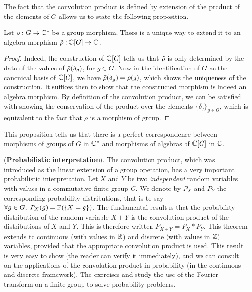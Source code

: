 The fact that the convolution product is defined by extension of the product of the elements of $G$ allows us to state the following proposition.

\begin{prop}
\label{prop-extension-morphism-grpe-algebra}
Let $\rho: G \rightarrow \mathbb{C}^*$ be a group morphism. There is a unique way to extend it to an algebra morphism $\tilde{\rho}: \mathbb{C}[G] \rightarrow \mathbb{C}$.
\end{prop}
\begin{proof}
Indeed, the construction of $\mathbb{C}[G]$ tells us that $\tilde{\rho}$ is only determined by the data of the values of $\tilde{\rho}(\delta_g)$, for $ g \in G$. Now in the identification of $G$ as the canonical basis of $\mathbb{C}[G]$, we have $\tilde{\rho}(\delta_g) = \rho(g)$, which shows the uniqueness of the construction. It suffices then to show that the constructed morphism is indeed an algebra morphism. By definition of the convolution product, we can be satisfied with showing the conservation of the product over the elements $\{\delta_g\}_{g \in G}$, which is equivalent to the fact that $\rho$ is a morphism of group.
\end{proof}
This proposition tells us that there is a perfect correspondence between morphisms of groups of $G$ in $\mathbb{C}^*$ and morphisms of algebras of $\mathbb{C}[G]$ in $\mathbb{C}$.

\begin{rem}{(\upshape \textbf{Probabilistic interpretation}).}
\label{rmk-interpretation-proba}
 The convolution product, which was introduced as the linear extension of a group operation, has a very important probabilistic interpretation. Let $ X $ and $ Y $ be two \textit{independent} random variables with values in a commutative finite group $G$. We denote by $ P_X $ and $ P_Y $ the corresponding probability distributions, that is to say $\forall g \in G, \; P_X(g) = \mathbb{P}(\{X = g\})$. The fundamental result is that the probability distribution of the random variable $ X + Y $ is the convolution product of the distributions of $ X $ and $ Y $. This is therefore written $ P_{X + Y} = P_X * P_Y $. This theorem extends to continuous (with values in $\mathbb{R} $) and discrete (with values in $\mathbb{Z}$) variables, provided that the appropriate convolution product is used. This result is very easy to show (the reader can verify it immediately), and we can consult \cite{ouvrard-2} on the applications of the convolution product in probability (in the continuous and discrete framework). The exercises  and  study the use of the Fourier transform on a finite group to solve probability problems.
\end{rem}

